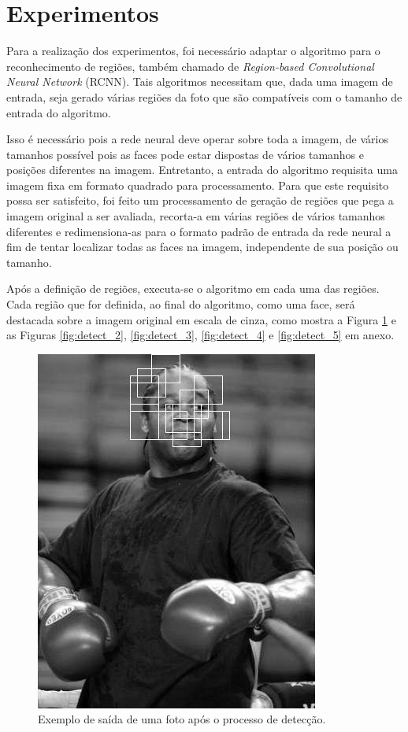\documentclass[10pt, conference]{IEEEtran}
\begin{document}
\section{Experimentos} \label{sec:experimentos}
	Para a realização dos experimentos, foi necessário adaptar o algoritmo para o reconhecimento de regiões, também chamado de \textit{Region-based Convolutional Neural Network} (RCNN). Tais algoritmos necessitam que, dada uma imagem de entrada, seja gerado várias regiões da foto que são compatíveis com o tamanho de entrada do algoritmo. 

	Isso é necessário pois a rede neural deve operar sobre toda a imagem, de vários tamanhos possível pois as faces pode estar dispostas de vários tamanhos e posições diferentes na imagem. Entretanto, a entrada do algoritmo requisita uma imagem fixa em formato quadrado para processamento. Para que este requisito possa ser satisfeito, foi feito um processamento de geração de regiões que pega a imagem original a ser avaliada, recorta-a em várias regiões de vários tamanhos diferentes e redimensiona-as para o formato padrão de entrada da rede neural a fim de tentar localizar todas as faces na imagem, independente de sua posição ou tamanho.

	Após a definição de regiões, executa-se o algoritmo em cada uma das regiões. Cada região que for definida, ao final do algoritmo, como uma face, será destacada sobre a imagem original em escala de cinza, como mostra a Figura \ref{fig:detect_} e as Figuras \ref{fig:detect_2}, \ref{fig:detect_3}, \ref{fig:detect_4} e \ref{fig:detect_5} em anexo.

	\begin{figure}[ht]
		\centering
		\includegraphics[width=0.75\linewidth]{img/detect.jpg}
		\caption{Exemplo de saída de uma foto após o processo de detecção.}
		\label{fig:detect_}
	\end{figure}
\end{document}
